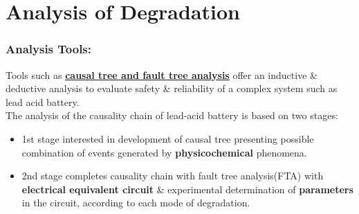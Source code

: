 \documentclass{beamer}
\begin{document}
\section{Analysis of Degradation}

{ %
    \begin{frame}[plain]
     \end{frame}
}

\begin{frame}     %
  \frametitle{Analysis Tools:}
  \fontsize{10pt}{16}\selectfont
  
  Tools such as \href{http://www.journal.esrgroups.org/jes/papers/4_2_2.pdf}{\textbf{\underline{causal tree and fault tree analysis}}} offer an inductive \& deductive analysis to evaluate safety \& reliability of a complex system such as lead acid battery.\\
  
  \bigskip
  The analysis of the causality chain of lead-acid battery is based on two stages:
  
  \begin{itemize}
    \item 1st stage interested in development of causal tree presenting possible combination of events generated by \textbf{physicochemical} phenomena.
    \item 2nd stage completes causality chain with fault tree analysis(FTA) with \textbf{electrical equivalent circuit} \& experimental determination of \textbf{parameters} in the 
    circuit, according to each mode of degradation.
  \end{itemize}
  
\end{frame}
\end{document}
